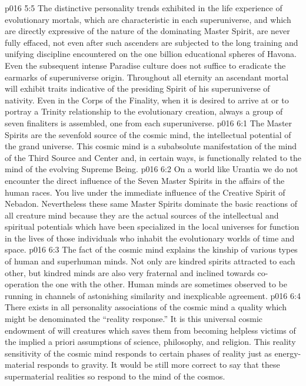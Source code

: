 \vs p016 5:5 The distinctive personality trends exhibited in the life experience of evolutionary mortals, which are characteristic in each superuniverse, and which are directly expressive of the nature of the dominating Master Spirit, are never fully effaced, not even after such ascenders are subjected to the long training and unifying discipline encountered on the one billion educational spheres of Havona. Even the subsequent intense Paradise culture does not suffice to eradicate the earmarks of superuniverse origin. Throughout all eternity an ascendant mortal will exhibit traits indicative of the presiding Spirit of his superuniverse of nativity. Even in the Corps of the Finality, when it is desired to arrive at or to portray a  Trinity relationship to the evolutionary creation, always a group of seven finaliters is assembled, one from each superuniverse.
\vs p016 6:1 The Master Spirits are the sevenfold source of the cosmic mind, the intellectual potential of the grand universe. This cosmic mind is a subabsolute manifestation of the mind of the Third Source and Center and, in certain ways, is functionally related to the mind of the evolving Supreme Being.
\vs p016 6:2 On a world like Urantia we do not encounter the direct influence of the Seven Master Spirits in the affairs of the human races. You live under the immediate influence of the Creative Spirit of Nebadon. Nevertheless these same Master Spirits dominate the basic reactions of all creature mind because they are the actual sources of the intellectual and spiritual potentials which have been specialized in the local universes for function in the lives of those individuals who inhabit the evolutionary worlds of time and space.
\vs p016 6:3 The fact of the cosmic mind explains the kinship of various types of human and superhuman minds. Not only are kindred spirits attracted to each other, but kindred minds are also very fraternal and inclined towards co\hyp{}operation the one with the other. Human minds are sometimes observed to be running in channels of astonishing similarity and inexplicable agreement.
\pc \vs p016 6:4 There exists in all personality associations of the cosmic mind a quality which might be denominated the “reality response.” It is this universal cosmic endowment of will creatures which saves them from becoming helpless victims of the implied a priori assumptions of science, philosophy, and religion. This reality sensitivity of the cosmic mind responds to certain phases of reality just as energy\hyp{}material responds to gravity. It would be still more correct to say that these supermaterial realities so respond to the mind of the cosmos.
